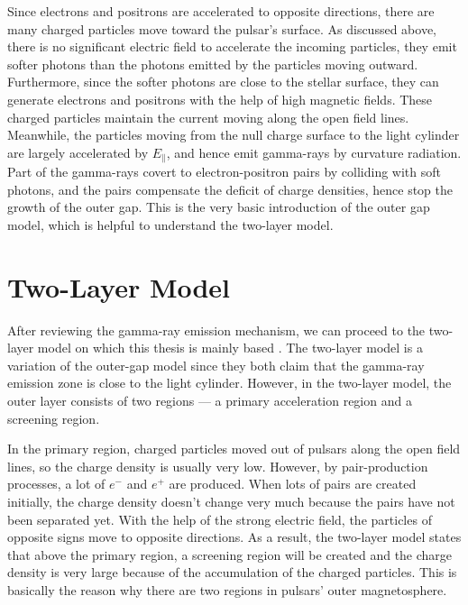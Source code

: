 \documentclass[a4paper, 12pt]{report}
\begin{document}
    Since electrons and positrons are accelerated to opposite directions, there are many 
    charged particles move toward the pulsar's surface. As discussed above, there is no 
    significant electric field to accelerate the incoming particles, they emit softer 
    photons than the photons emitted by the particles moving outward. Furthermore, since the 
    softer photons are close to the stellar surface, they can generate electrons and 
    positrons with the help of high magnetic fields. These charged particles maintain the current 
    moving along the open field lines. Meanwhile, the particles moving from the null charge 
    surface to the light cylinder are largely accelerated by $E_{\parallel}$, and hence 
    emit gamma-rays by curvature radiation. Part of the gamma-rays covert to
    electron-positron pairs by colliding with soft photons, and the pairs compensate 
    the deficit of charge densities, hence stop the growth of the outer gap. This is the 
    very basic introduction of the outer gap model, which is helpful to understand the 
    two-layer model. 
        
  \section{Two-Layer Model}
    After reviewing the gamma-ray emission mechanism, we can proceed to
    the two-layer model on which this thesis is mainly based
    \citep{0004-637X-720-1-178}. The two-layer model is a variation of the outer-gap model 
    since they both claim that the gamma-ray emission zone is close to the light cylinder. 
    However, in the two-layer model, the outer layer consists of two regions --- a primary 
    acceleration region and a screening region. 

    In the primary region, charged particles moved out of pulsars along the open field 
    lines, so the charge density is usually very low. 
    However, by pair-production processes, a lot of $e^{-}$ and $e^{+}$ are produced. 
    When lots of pairs are created initially, the charge density 
    doesn't change very much because the pairs have not been separated yet. With the help 
    of the strong electric field, the particles of opposite signs move to opposite directions. 
    As a result, the two-layer model states that above the primary region, a screening 
    region will be created and the charge density is very large because of the accumulation 
    of the charged particles. This is basically the reason why there are two regions in 
    pulsars' outer magnetosphere.
\end{document}
